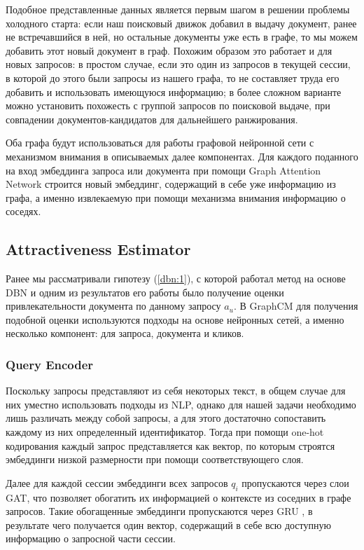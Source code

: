 \documentclass[diploma]{nanolab2015}
\begin{document}
Подобное представленные данных является первым шагом в решении проблемы холодного старта: если наш поисковый движок добавил в выдачу документ, ранее не встречавшийся в ней, но остальные документы уже есть в графе, то мы можем добавить этот новый документ в граф. Похожим образом это работает и для новых запросов: в простом случае, если это один из запросов в текущей сессии, в которой до этого были запросы из нашего графа, то не составляет труда его добавить и использовать имеющуюся информацию; в более сложном варианте можно установить похожесть с группой запросов по поисковой выдаче, при совпадении документов-кандидатов для дальнейшего ранжирования.

Оба графа будут использоваться для работы графовой нейронной сети с механизмом внимания \cite{GAT} в описываемых далее компонентах. Для каждого поданного на вход эмбеддинга запроса или документа при помощи Graph Attention Network строится новый эмбеддинг, содержащий в себе уже информацию из графа, а именно извлекаемую при помощи механизма внимания \cite{Attention} информацию о соседях.

\subsection{Attractiveness Estimator}
Ранее мы рассматривали гипотезу (\ref{dbn:1}), с которой работал метод на основе DBN и одним из результатов его работы было получение оценки привлекательности документа по данному запросу $a_u$. В GraphCM для получения подобной оценки используются подходы на основе нейронных сетей, а именно несколько компонент: для запроса, документа и кликов.

\subsubsection{Query Encoder}
Поскольку запросы представляют из себя некоторых текст, в общем случае для них уместно использовать подходы из NLP, однако для нашей задачи необходимо лишь различать между собой запросы, а для этого достаточно сопоставить каждому из них определенный идентификатор. Тогда при помощи one-hot кодирования каждый запрос представляется как вектор, по которым строятся эмбеддинги низкой размерности при помощи соответствующего слоя.

Далее для каждой сессии эмбеддинги всех запросов $q_i$ пропускаются через слои GAT, что позволяет обогатить их информацией о контексте из соседних в графе запросов. Такие обогащенные эмбеддинги пропускаются через GRU \cite{GRU}, в результате чего получается один вектор, содержащий в себе всю доступную информацию о запросной части сессии.
\end{document}
